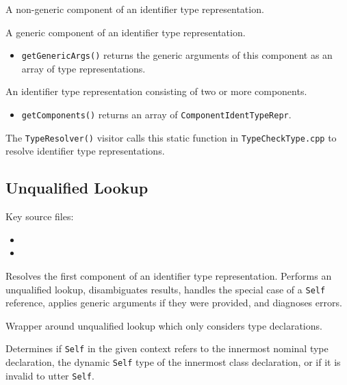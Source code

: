 \documentclass[../generics]{subfiles}
\begin{document}
A non-generic component of an identifier type representation.

A generic component of an identifier type representation.
\begin{itemize}
\item \texttt{getGenericArgs()} returns the generic arguments of this component as an array of type representations.
\end{itemize}

An identifier type representation consisting of two or more components.
\begin{itemize}
\item \texttt{getComponents()} returns an array of \texttt{ComponentIdentTypeRepr}.
\end{itemize}

The \texttt{TypeResolver()} visitor calls this static function in \texttt{TypeCheckType.cpp} to resolve identifier type representations.

\subsection*{Unqualified Lookup}

Key source files:
\begin{itemize}
\item {}
\item {}
\end{itemize}

Resolves the first component of an identifier type representation. Performs an unqualified lookup, disambiguates results, handles the special case of a \texttt{Self} reference, applies generic arguments if they were provided, and diagnoses errors.

Wrapper around unqualified lookup which only considers type declarations.

Determines if \texttt{Self} in the given context refers to the innermost nominal type declaration, the dynamic \texttt{Self} type of the innermost class declaration, or if it is invalid to utter \texttt{Self}.
\end{document}
